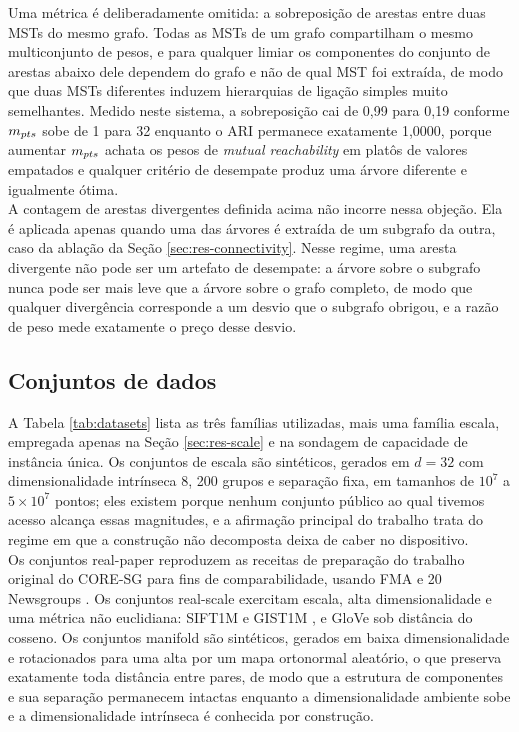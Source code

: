 Uma métrica é deliberadamente omitida: a sobreposição de arestas entre duas \ac{MST}s do mesmo grafo. Todas as \ac{MST}s de um grafo compartilham o mesmo multiconjunto de pesos, e para qualquer limiar os componentes do conjunto de arestas abaixo dele dependem do grafo e não de qual \ac{MST} foi extraída, de modo que duas \ac{MST}s diferentes induzem hierarquias de ligação simples muito semelhantes. Medido neste sistema, a sobreposição cai de 0,99 para 0,19 conforme $m_{pts}$ sobe de 1 para 32 enquanto o \ac{ARI} permanece exatamente 1,0000, porque aumentar $m_{pts}$ achata os pesos de \textit{mutual reachability} em platôs de valores empatados e qualquer critério de desempate produz uma árvore diferente e igualmente ótima.\\

A contagem de arestas divergentes definida acima não incorre nessa objeção. Ela é aplicada apenas quando uma das árvores é extraída de um subgrafo da outra, caso da ablação da Seção \ref{sec:res-connectivity}. Nesse regime, uma aresta divergente não pode ser um artefato de desempate: a árvore sobre o subgrafo nunca pode ser mais leve que a árvore sobre o grafo completo, de modo que qualquer divergência corresponde a um desvio que o subgrafo obrigou, e a razão de peso mede exatamente o preço desse desvio.\\

\subsection{Conjuntos de dados\label{sec:datasets}}

A Tabela \ref{tab:datasets} lista as três famílias utilizadas, mais uma família escala, empregada apenas na Seção \ref{sec:res-scale} e na sondagem de capacidade de instância única. Os conjuntos de escala são sintéticos, gerados em $d = 32$ com dimensionalidade intrínseca 8, 200 grupos e separação fixa, em tamanhos de $10^7$ a $5 \times 10^7$ pontos; eles existem porque nenhum conjunto público ao qual tivemos acesso alcança essas magnitudes, e a afirmação principal do trabalho trata do regime em que a construção não decomposta deixa de caber no dispositivo.\\

Os conjuntos real-paper reproduzem as receitas de preparação do trabalho original do \ac{CORE-SG} \cite{core-sg} para fins de comparabilidade, usando FMA \cite{fma} e 20 Newsgroups \cite{newsgroups}. Os conjuntos real-scale exercitam escala, alta dimensionalidade e uma métrica não euclidiana: SIFT1M e GIST1M \cite{sift_gist}, e GloVe \cite{glove} sob distância do cosseno. Os conjuntos manifold são sintéticos, gerados em baixa dimensionalidade e rotacionados para uma alta por um mapa ortonormal aleatório, o que preserva exatamente toda distância entre pares, de modo que a estrutura de componentes e sua separação permanecem intactas enquanto a dimensionalidade ambiente sobe e a dimensionalidade intrínseca é conhecida por construção.\\

